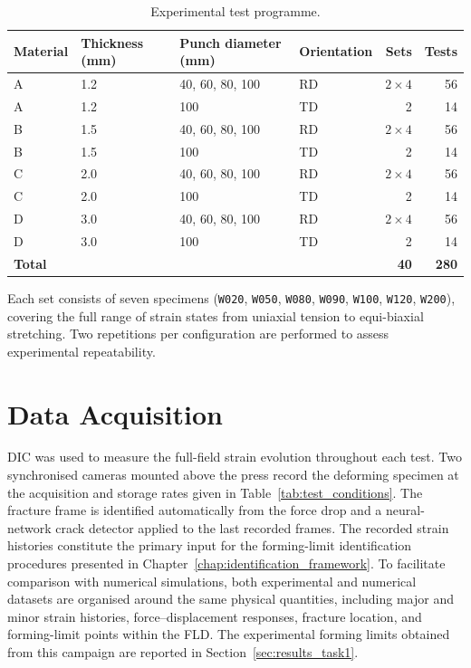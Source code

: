 \begin{table}[htbp]
\centering
\begin{tabular}{llllrr}
\toprule
Material & Thickness (\si{\milli\meter}) & Punch diameter (\si{\milli\meter}) & Orientation & Sets & Tests \\
\midrule
A & 1.2 & 40, 60, 80, 100 & RD & $2 \times 4$ & 56 \\
A & 1.2 & 100 & TD & 2 & 14 \\
B & 1.5 & 40, 60, 80, 100 & RD & $2 \times 4$ & 56 \\
B & 1.5 & 100 & TD & 2 & 14 \\
C & 2.0 & 40, 60, 80, 100 & RD & $2 \times 4$ & 56 \\
C & 2.0 & 100 & TD & 2 & 14 \\
D & 3.0 & 40, 60, 80, 100 & RD & $2 \times 4$ & 56 \\
D & 3.0 & 100 & TD & 2 & 14 \\
\midrule
\multicolumn{4}{l}{\textbf{Total}} & \textbf{40} & \textbf{280} \\
\bottomrule
\end{tabular}
\caption{Experimental test programme.}
\label{tab:experimental_matrix}
\end{table}

Each set consists of seven specimens (\texttt{W020}, \texttt{W050},
\texttt{W080}, \texttt{W090}, \texttt{W100}, \texttt{W120}, \texttt{W200}),
covering the full range of strain states from uniaxial tension to
equi-biaxial stretching. Two repetitions per configuration are performed to
assess experimental repeatability.

\section{Data Acquisition}

DIC was used to measure the full-field strain evolution throughout each test.
Two synchronised cameras mounted above the press record the deforming specimen
at the acquisition and storage rates given in Table~\ref{tab:test_conditions}.
The fracture frame is identified automatically from the force drop and a
neural-network crack detector applied to the last recorded frames.
The recorded strain histories constitute the primary input for the
forming-limit identification procedures presented in
Chapter~\ref{chap:identification_framework}. To facilitate comparison with
numerical simulations, both experimental and numerical datasets are organised
around the same physical quantities, including major and minor strain histories,
force--displacement responses, fracture location, and forming-limit points within the FLD. The experimental forming limits obtained from this campaign are
reported in Section~\ref{sec:results_task1}.
